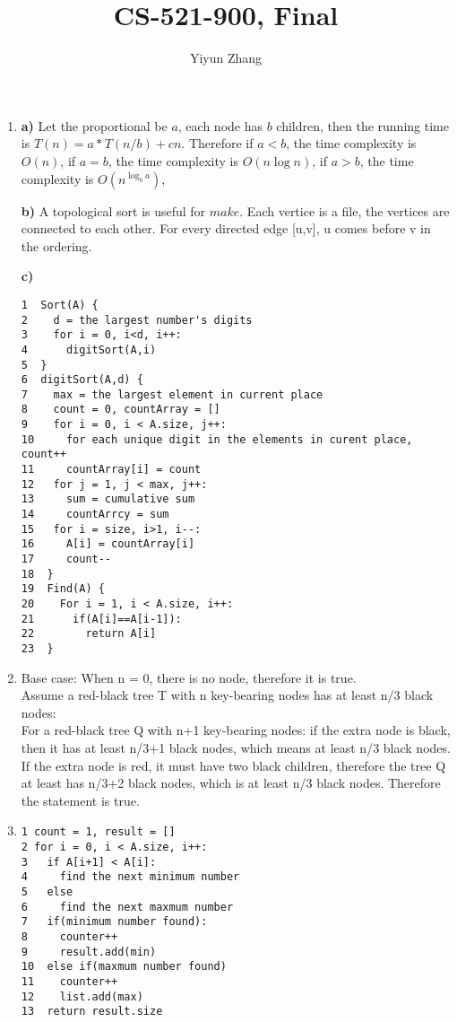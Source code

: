 \documentclass{article}
\title{CS-521-900, Final}
\author{Yiyun Zhang}
\begin{document}
\maketitle

\begin{enumerate}
\item {\bf a)} 
Let the proportional be $a$, each node has $b$ children, then the running time is $T(n) = a*T(n/b)+cn$. Therefore if $a<b$, the time complexity is $O(n)$, if $a=b$, the time complexity is $O(n\log n)$, if $a>b$, the time complexity is $O(n^{\log_b a})$,

{\bf b)} A topological sort is useful for $make$. Each vertice is a file, the vertices are connected to each other. For every directed edge [u,v], u comes before v in the ordering.

{\bf c)}
\begin{verbatim}
1  Sort(A) { 
2    d = the largest number's digits
3    for i = 0, i<d, i++:
4      digitSort(A,i)
5  }
6  digitSort(A,d) {
7    max = the largest element in current place
8    count = 0, countArray = []
9    for i = 0, i < A.size, j++:
10     for each unique digit in the elements in curent place, count++
11     countArray[i] = count
12   for j = 1, j < max, j++:
13     sum = cumulative sum
14     countArrcy = sum
15   for i = size, i>1, i--:
16     A[i] = countArray[i]
17     count--
18  }
19  Find(A) {
20    For i = 1, i < A.size, i++:
21      if(A[i]==A[i-1]):
22        return A[i] 
23  }
\end{verbatim}

\item
Base case: When n = 0, there is no node, therefore it is true. \\
Assume a red-black tree T with n key-bearing nodes has at least n/3 black nodes: \\
For a red-black tree Q with n+1 key-bearing nodes: if the extra node is black, then it has at least n/3+1 black nodes, which means at least n/3 black nodes. If the extra node is red, it must have two black children, therefore the tree Q at least has n/3+2 black nodes, which is at least n/3 black nodes. Therefore the statement is true.

\item
\begin{verbatim}
1 count = 1, result = []
2 for i = 0, i < A.size, i++:
3   if A[i+1] < A[i]:
4     find the next minimum number
5   else
6     find the next maxmum number
7   if(minimum number found):
8     counter++
9     result.add(min)
10  else if(maxmum number found)
11    counter++
12    list.add(max)
13  return result.size
\end{verbatim}


\end{enumerate}
\end{document}
